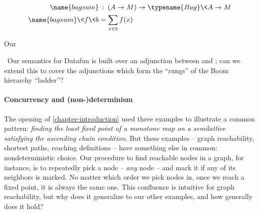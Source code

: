 \begin{align*}
  \name{bagsum} &\isa (A \to M) \to \typename{Bag}\<A \to M\\
  \name{bagsum} \<f \<b &= \sum_{x \in b} f(x)
\end{align*}

\noindent
Our

\XXX\
Our semantics for Datafun is built over an adjunction between  and ; can we extend this to cover the adjunctions which form the ``rungs'' of the Boom hierarchy ``ladder''?


\XXX


\paragraph{Concurrency and (non-)determinism}

The opening of \cref{chapter-introduction} used three examples to illustrate
a common pattern: \emph{finding the least fixed point of a monotone map on a
semilattice satisfying the ascending chain condition}. But these examples -- graph reachability, shortest paths, reaching definitions -- have something else in common: nondeterministic choice. Our procedure to find reachable nodes in a graph, for instance, is to repeatedly pick a node -- \emph{any} node -- and mark it if any of its neighbors is marked. No matter which order we pick nodes in, once we reach a fixed point, it is always the same one.\footnotemark{} This confluence is intuitive for graph reachability, but why does it generalize to our other examples, and how generally does it hold?



